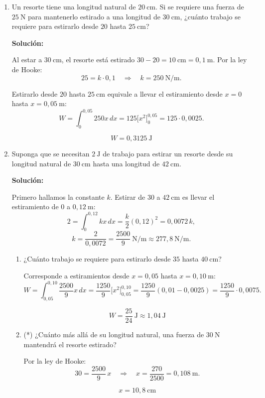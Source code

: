 \documentclass[12pt]{article}
\newcommand{\solucion}{%
    \vspace{0.8em}%
    \textbf{Solución:}%
}
\begin{document}
\begin{enumerate}[label=\alph*.-]
    \item Un resorte tiene una longitud natural de $20\ \text{cm}$. Si
    se requiere una fuerza de $25\ \text{N}$ para mantenerlo estirado a
    una longitud de $30\ \text{cm}$, ¿cuánto trabajo se requiere para
    estirarlo desde $20$ hasta $25\ \text{cm}$?

    \solucion

    Al estar a $30\ \text{cm}$, el resorte está estirado
    $30-20=10\ \text{cm}=0{,}1\ \text{m}$. Por la ley de Hooke:
    \[
    25=k\cdot0{,}1
    \quad\Rightarrow\quad
    k=250\ \text{N/m}.
    \]

    Estirarlo desde $20$ hasta $25\ \text{cm}$ equivale a llevar el
    estiramiento desde $x=0$ hasta $x=0{,}05\ \text{m}$:
    \[
    W=\int_{0}^{0{,}05}250x\,dx
    =125\Big[x^2\Big]_{0}^{0{,}05}
    =125\cdot0{,}0025.
    \]

    \[
    \boxed{
    W=0{,}3125\ \text{J}
    }
    \]


    \item Suponga que se necesitan $2\ \text{J}$ de trabajo para estirar
    un resorte desde su longitud natural de $30\ \text{cm}$ hasta una
    longitud de $42\ \text{cm}$.

    \solucion

    Primero hallamos la constante $k$. Estirar de $30$ a $42\ \text{cm}$
    es llevar el estiramiento de $0$ a $0{,}12\ \text{m}$:
    \[
    2=\int_{0}^{0{,}12}kx\,dx=\frac k2(0{,}12)^2=0{,}0072\,k,
    \]
    \[
    k=\frac{2}{0{,}0072}=\frac{2500}{9}\ \text{N/m}\approx277{,}8\ \text{N/m}.
    \]

    \begin{enumerate}[label=\roman*)]

        \item ¿Cuánto trabajo se requiere para estirarlo desde $35$
        hasta $40\ \text{cm}$?

        Corresponde a estiramientos desde $x=0{,}05$ hasta
        $x=0{,}10\ \text{m}$:
        \[
        W=\int_{0{,}05}^{0{,}10}\frac{2500}{9}x\,dx
        =\frac{1250}{9}\Big[x^2\Big]_{0{,}05}^{0{,}10}
        =\frac{1250}{9}\left(0{,}01-0{,}0025\right)
        =\frac{1250}{9}\cdot0{,}0075.
        \]

        \[
        \boxed{
        W=\frac{25}{24}\ \text{J}\approx1{,}04\ \text{J}
        }
        \]

        \item (*) ¿Cuánto más allá de su longitud natural, una fuerza
        de $30\ \text{N}$ mantendrá el resorte estirado?

        Por la ley de Hooke:
        \[
        30=\frac{2500}{9}\,x
        \quad\Rightarrow\quad
        x=\frac{270}{2500}=0{,}108\ \text{m}.
        \]

        \[
        \boxed{
        x=10{,}8\ \text{cm}
        }
        \]

    \end{enumerate}

\end{enumerate}
\end{document}
